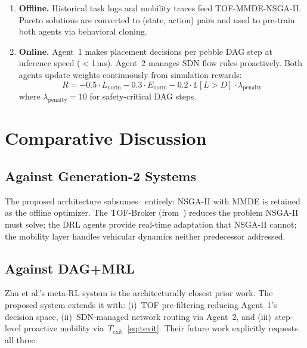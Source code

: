 \documentclass[12pt,a4paper]{article}
\begin{document}
\begin{enumerate}[leftmargin=*, label=\textbf{Phase \arabic*:}]
  \item \textbf{Offline.} Historical task logs and mobility traces feed
    TOF-MMDE-NSGA-II. Pareto solutions are converted to (state, action) pairs
    and used to pre-train both agents via behavioral cloning.
  \item \textbf{Online.} Agent~1 makes placement decisions per pebble DAG step
    at inference speed ($<$1\,ms). Agent~2 manages SDN flow rules proactively.
    Both agents update weights continuously from simulation rewards:
    \[
      R = -0.5\cdot L_{\text{norm}} - 0.3\cdot E_{\text{norm}}
        - 0.2\cdot \mathbb{1}[L > D] \cdot \lambda_{\text{penalty}}
    \]
    where $\lambda_{\text{penalty}} = 10$ for safety-critical DAG steps.
\end{enumerate}

\section{Comparative Discussion}
\label{sec:discussion}

\subsection{Against Generation-2 Systems}

The proposed architecture subsumes~\cite{jafari2021} entirely: NSGA-II with MMDE
is retained as the offline optimizer. The TOF-Broker (from~\cite{nouri2024tof})
reduces the problem NSGA-II must solve; the DRL agents provide real-time
adaptation that NSGA-II cannot; the mobility layer handles vehicular dynamics
neither predecessor addressed.

\subsection{Against DAG+MRL \cite{zhu2025dag}}

Zhu et al.'s meta-RL system is the architecturally closest prior work. The
proposed system extends it with: (i)~TOF pre-filtering reducing Agent~1's
decision space, (ii)~SDN-managed network routing via Agent~2, and
(iii)~step-level proactive mobility via~$T_{\text{exit}}$~\eqref{eq:texit}.
Their future work explicitly requests all three.
\end{document}
